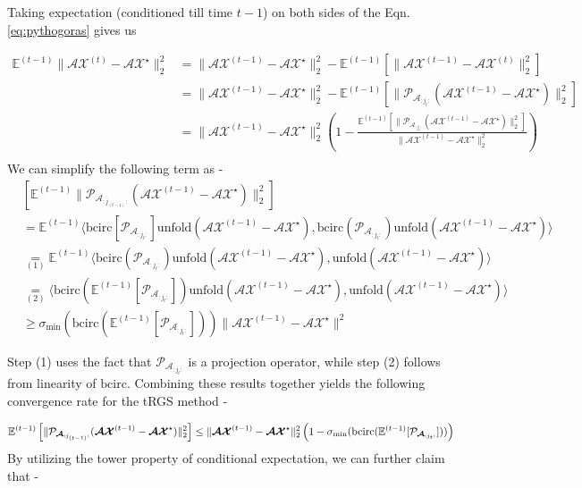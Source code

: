 \documentclass[10.5pt]{amsart}
\newcommand{\E}{\mathbb{E}}
\newcommand{\tens}[1]{\bm{\mathcal{#1}}}
\def\tA{{\tens{A}}}  %
\def\tX{{\tens{X}}}  %
\def\E{{\mathbb{E}}} %
\def\bcirc{{\text{bcirc}}}
\def\unfold{{\text{unfold}}}
\begin{document}
Taking expectation (conditioned till time $t-1$) on both sides of the Eqn. \ref{eq:pythogoras} gives us

\begin{align*}
    \E^{(t-1)}\| \tA \tX^{(t)} - \tA \tX^{\star}\|_2^2 &= \| \tA \tX^{(t-1)} - \tA \tX^{\star}\|_2^2- \E^{(t-1)}\left[\|\tA\tX^{(t-1)} - \tA\tX^{(t)}\|_2^2\right]\\  
    &= \| \tA \tX^{(t-1)} - \tA \tX^{\star}\|_2^2- \E^{(t-1)}\left[\|\mathcal{P}_{\tA_{:j_{t}:}}(\tA \tX^{(t-1)} - \tA \tX^\star) \|_2^2\right]\\ 
    &= \| \tA \tX^{(t-1)} - \tA \tX^{\star}\|_2^2\left (1 - \frac{\E^{(t-1)}\left[\|\mathcal{P}_{\tA_{:j_{t}:}}(\tA \tX^{(t-1)} - \tA \tX^\star) \|_2^2\right]}{\| \tA \tX^{(t-1)} - \tA \tX^{\star}\|_2^2}\right)\\
\end{align*}
We can simplify the following term as - 
\begin{align*}
&\left[\E^{(t-1)}\|\mathcal{P}_{\tA_{:j_{(t-1)}:}}(\tA \tX^{(t-1)} -\tA  \tX^{\star})\|_2^2\right]\\
&= \E^{(t-1)}\langle \bcirc[\mathcal{P}_{\tA_{:j_{t}:}}]\unfold(\tA \tX^{(t-1)} -\tA \tX^{\star}),\bcirc(\mathcal{P}_{\tA_{:j_{t}:}})\unfold(\tA \tX^{(t-1)} -\tA \tX^{\star}) \rangle \\
&\underset{(1)}{=} \E^{(t-1)}\langle \bcirc(\mathcal{P}_{\tA_{:j_{t}:}})\unfold(\tA \tX^{(t-1)} -\tA \tX^{\star}), \unfold(\tA \tX^{(t-1)} -\tA \tX^{\star}) \rangle \\
&\underset{(2)}{=}\langle \bcirc(\E^{(t-1)}[\mathcal{P}_{\tA_{:j_{t}:}}])\unfold(\tA \tX^{(t-1)} -\tA \tX^{\star}), \unfold(\tA \tX^{(t-1)} -\tA \tX^{\star}) \rangle \\
&\geq \sigma_{\min}( \bcirc(\E^{(t-1)}[\mathcal{P}_{\tA_{:j_{t}:}}]))\|\tA \tX^{(t-1)} -\tA \tX^{\star}\|^2
\end{align*}

Step (1) uses the fact that $\mathcal{P}_{\tA_{:j_{t}:}}$ is a projection operator, while step (2) follows from linearity of $\bcirc$. Combining these results together yields the following convergence rate for the tRGS method - 

$$ \E^{(t-1)}\left[\|\mathcal{P}_{\tA_{:j_{(t-1)}:}}(\tA \tX^{(t-1)} -\tA \tX^{\star})\|_2^2 \right]\leq\| \tA \tX^{(t-1)} - \tA \tX^{\star}\|_2^2\left (1 - \sigma_{\min}( \bcirc(\E^{(t-1)}[\mathcal{P}_{\tA_{:j_{t}:}}]))\right)\\$$
By utilizing the tower property of conditional expectation, we can further claim that - 
\end{document}
